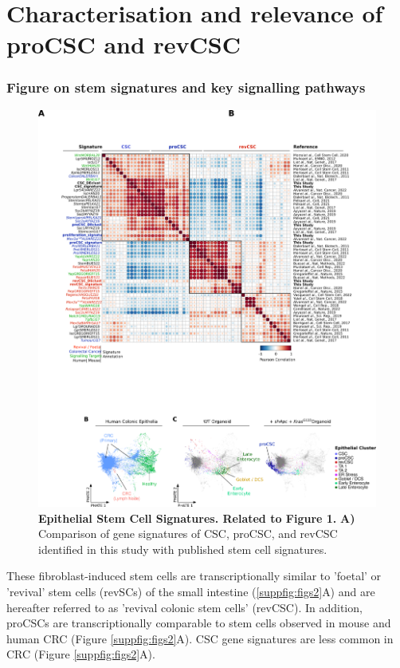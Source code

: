 \section{Characterisation and relevance of proCSC and revCSC}




\subsubsection{Figure on stem signatures and key signalling pathways}

\begin{figure}
    \centering
    \includegraphics{04seq/figs/4SEQ_StemSign.png}
    \caption{\textbf{Epithelial Stem Cell Signatures. Related to Figure 1.} \textbf{A)} Comparison of gene signatures of CSC, proCSC, and revCSC identified in this study with published stem cell signatures.}
    \label{fig:}
\end{figure}


These fibroblast-induced stem cells are transcriptionally similar to 'foetal' \cite{mustata_identification_2013, yui_yap_2018} or 'revival' stem cells (revSCs) \cite{ayyaz_singlecell_2019} of the small intestine (\ref{suppfig:figs2}A) and are hereafter referred to as 'revival colonic stem cells' (revCSC).
In addition, proCSCs are transcriptionally comparable to stem cells observed in mouse and human CRC (Figure \ref{suppfig:figs2}A). CSC gene signatures are less common in CRC (Figure \ref{suppfig:figs2}A).


